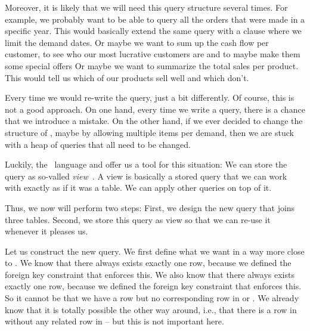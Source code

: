 Moreover, it is likely that we will need this query structure several times.
For example, we probably want to be able to query all the orders that were made in a specific year.
This would basically extend the same query with a  clause where we limit the demand dates.
Or maybe we want to sum up the cash flow per customer, to see who our most lucrative customers are and to maybe make them some special offers
Or maybe we want to summarize the total sales per product.
This would tell us which of our products sell well and which don't.

Every time we would re-write the query, just a bit differently.
Of course, this is not a good approach.
On one hand, every time we write a query, there is a chance that we introduce a mistake.
On the other hand, if we ever decided to change the structure of \db, maybe by allowing multiple items per demand, then we are stuck with a heap of queries that all need to be changed.

Luckily, the \sql\ language and  offer us a tool for this situation:
We can store the query as so-valled \emph{view}~\cite{PGDG:PD:CV}.
A view is basically a stored query that we can work with exactly as if it was a table.
We can apply other  queries on top of it.

Thus, we now will perform two steps:
First, we design the new query that joins three tables.
Second, we store this query as view so that we can re-use it whenever it pleases us.

Let us construct the new query.
We first define what we want in a way more close to \sql.
We know that there always exists exactly one  row, because we defined the foreign key  constraint that enforces this.
We also know that there always exists exactly one  row, because we defined the foreign key  constraint that enforces this.
So it cannot be that we have a row  but no corresponding row in  or .
We already know that it is totally possible the other way around, i.e., that there is a row in  without any related row in  -- but this is not important here.

